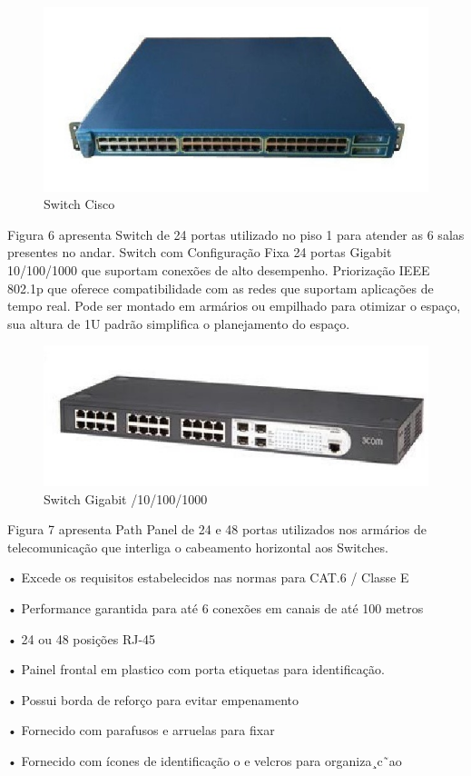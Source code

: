 \documentclass[	DIV=calc,%
							paper=a4,%
							fontsize=12pt,%
							onecolumn]{scrartcl}	 					%
\begin{document}
\begin{figure}
	\centering
	\includegraphics[width=0.7\linewidth]{switch}
	\caption{Switch Cisco }
	\label{fig:switch}
\end{figure}


Figura 6 apresenta Switch de 24 portas utilizado no piso 1 para atender as 6 salas
presentes no andar. Switch com Configuração Fixa 24 portas Gigabit 10/100/1000
que suportam conexões de alto desempenho. Priorização IEEE 802.1p que oferece compatibilidade com as redes que suportam aplicações de tempo real. Pode ser montado em armários ou empilhado para otimizar o espaço, sua altura de 1U padrão simplifica o planejamento do espaço.
\begin{figure}
	\centering
	\includegraphics[width=0.7\linewidth]{switchm}
	\caption{Switch Gigabit /10/100/1000}
	\label{fig:switchm}
\end{figure}

Figura 7 apresenta Path Panel de 24 e 48 portas utilizados nos armários de telecomunicação que interliga o cabeamento horizontal aos Switches.

• Excede os requisitos estabelecidos nas normas para CAT.6 / Classe E

• Performance garantida para até 6 conexões em canais de até 100 metros

• 24 ou 48 posições RJ-45

• Painel frontal em plastico com porta etiquetas para identificação. 

• Possui borda de reforço para evitar empenamento

• Fornecido com parafusos e arruelas para fixar 

• Fornecido com ícones de identificação o e velcros para organiza¸c˜ao
\end{document}
